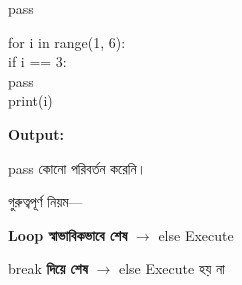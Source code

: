 \begin{codeoutputbox}{\textenglish{\ttfamily pass}}

\noindent
\begin{minipage}[t]{0.53\linewidth}
\codeheading

\begin{english}
\ttfamily
for i in range(1, 6):\\
\hspace*{4mm}if i == 3:\\
\hspace*{8mm}pass\\
\hspace*{4mm}print(i)
\end{english}

\end{minipage}
\hfill
\begin{minipage}[t]{0.43\linewidth}
\outputheading

\textbf{Output:}

\textenglish{    }

\medskip

\textenglish{\ttfamily pass}
কোনো পরিবর্তন করেনি।

\end{minipage}

\end{codeoutputbox}



গুরুত্বপূর্ণ নিয়ম—

\begin{center}

\textbf{Loop স্বাভাবিকভাবে শেষ}
\(\longrightarrow\)
\textenglish{\ttfamily else}
Execute

\qquad

\textenglish{\ttfamily break}
\textbf{ দিয়ে শেষ}
\(\longrightarrow\)
\textenglish{\ttfamily else}
Execute হয় না

\end{center}

